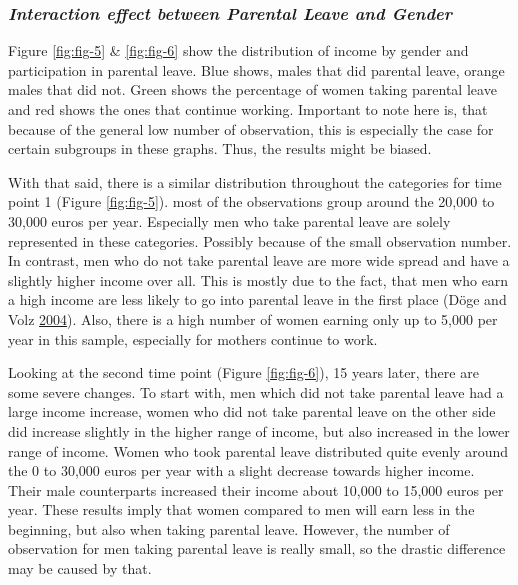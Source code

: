 \documentclass[
  12pt,
]{article}
\begin{document}
\hypertarget{interaction-effect-between-parental-leave-and-gender}{%
\subsubsection*{\texorpdfstring{\emph{Interaction effect between Parental Leave and Gender}}{Interaction effect between Parental Leave and Gender}}\label{interaction-effect-between-parental-leave-and-gender}}

Figure \ref{fig:fig-5} \& \ref{fig:fig-6} show the distribution of income by gender and participation in parental leave. Blue shows, males that did parental leave, orange males that did not. Green shows the percentage of women taking parental leave and red shows the ones that continue working.
Important to note here is, that because of the general low number of observation, this is especially the case for certain subgroups in these graphs. Thus, the results might be biased.

With that said, there is a similar distribution throughout the categories for time point 1 (Figure \ref{fig:fig-5}). most of the observations group around the 20,000 to 30,000 euros per year. Especially men who take parental leave are solely represented in these categories. Possibly because of the small observation number. In contrast, men who do not take parental leave are more wide spread and have a slightly higher income over all. This is mostly due to the fact, that men who earn a high income are less likely to go into parental leave in the first place (Döge and Volz \protect\hyperlink{ref-doge_manner_2004}{2004}). Also, there is a high number of women earning only up to 5,000 per year in this sample, especially for mothers continue to work.

Looking at the second time point (Figure \ref{fig:fig-6}), 15 years later, there are some severe changes. To start with, men which did not take parental leave had a large income increase, women who did not take parental leave on the other side did increase slightly in the higher range of income, but also increased in the lower range of income. Women who took parental leave distributed quite evenly around the 0 to 30,000 euros per year with a slight decrease towards higher income. Their male counterparts increased their income about 10,000 to 15,000 euros per year. These results imply that women compared to men will earn less in the beginning, but also when taking parental leave. However, the number of observation for men taking parental leave is really small, so the drastic difference may be caused by that.
\end{document}
